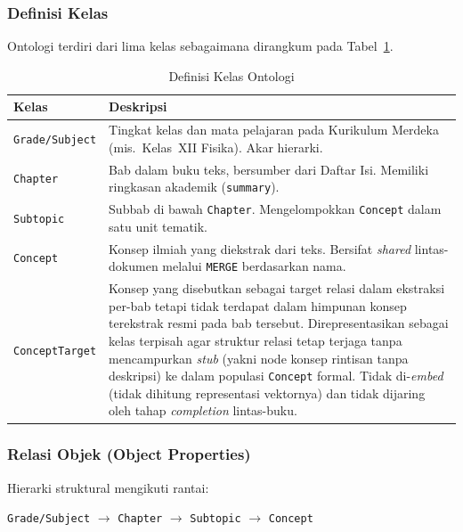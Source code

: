 \documentclass[main]{subfiles}
\begin{document}
\subsubsection*{Definisi Kelas}

Ontologi terdiri dari lima kelas sebagaimana dirangkum pada
Tabel~\ref{tab:kelas-ontologi}.

\begin{table}[htbp]
  \centering
  \renewcommand{\arraystretch}{1.3}
  \caption{Definisi Kelas Ontologi}
  \label{tab:kelas-ontologi}
  \begin{tabularx}{\textwidth}{@{}lX@{}}
    \toprule
    \textbf{Kelas} & \textbf{Deskripsi} \\
    \midrule
    \texttt{Grade/Subject}
      & Tingkat kelas dan mata pelajaran pada Kurikulum Merdeka
        (mis.\ Kelas~XII Fisika). Akar hierarki. \\
    \texttt{Chapter}
      & Bab dalam buku teks, bersumber dari Daftar Isi.
        Memiliki ringkasan akademik (\texttt{summary}). \\
    \texttt{Subtopic}
      & Subbab di bawah \texttt{Chapter}.
        Mengelompokkan \texttt{Concept} dalam satu unit tematik. \\
    \texttt{Concept}
      & Konsep ilmiah yang diekstrak dari teks.
        Bersifat \textit{shared} lintas-dokumen melalui
        \texttt{MERGE} berdasarkan nama. \\
    \texttt{ConceptTarget}
      & Konsep yang disebutkan sebagai target relasi dalam ekstraksi
        per-bab tetapi tidak terdapat dalam himpunan konsep
        terekstrak resmi pada bab tersebut. Direpresentasikan sebagai
        kelas terpisah agar struktur relasi tetap terjaga tanpa
        mencampurkan \textit{stub} (yakni node konsep rintisan tanpa
        deskripsi) ke dalam populasi \texttt{Concept} formal. Tidak
        di-\textit{embed} (tidak dihitung representasi vektornya) dan tidak
        dijaring oleh tahap \textit{completion} lintas-buku. \\
    \bottomrule
  \end{tabularx}
\end{table}

\subsubsection*{Relasi Objek (Object Properties)}

Hierarki struktural mengikuti rantai:

\begin{center}
  \texttt{Grade/Subject} $\rightarrow$ \texttt{Chapter}
  $\rightarrow$ \texttt{Subtopic} $\rightarrow$ \texttt{Concept}
\end{center}
\end{document}
